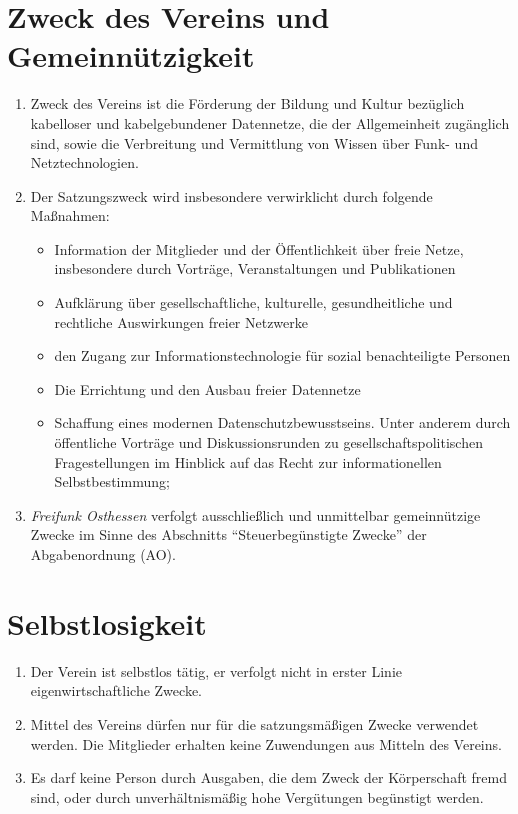 \documentclass[ngerman]{article}
\begin{document}
\section{Zweck des Vereins und Gemeinnützigkeit}
\begin{enumerate}
  \item Zweck des Vereins ist die Förderung der Bildung und Kultur bezüglich kabelloser und kabelgebundener Datennetze, die der Allgemeinheit zugänglich sind, sowie die Verbreitung und Vermittlung von Wissen über Funk- und Netztechnologien.
  \item Der Satzungszweck wird insbesondere verwirklicht durch folgende Maßnahmen:
  \begin{itemize}
    \item Information der Mitglieder und der Öffentlichkeit über freie Netze, insbesondere durch Vorträge, Veranstaltungen und Publikationen
    \item Aufklärung über gesellschaftliche, kulturelle, gesundheitliche und rechtliche Auswirkungen freier Netzwerke
    \item den Zugang zur Informationstechnologie für sozial benachteiligte Personen
    \item Die Errichtung und den Ausbau freier Datennetze
    \item Schaffung eines modernen Datenschutzbewusstseins.
    Unter anderem durch öffentliche Vorträge und Diskussionsrunden zu gesellschaftspolitischen Fragestellungen im Hinblick auf das Recht zur informationellen Selbstbestimmung;
  \end{itemize}
  \item \emph{Freifunk Osthessen} verfolgt ausschließlich und unmittelbar gemeinnützige Zwecke im Sinne des Abschnitts ``Steuerbegünstigte Zwecke'' der Abgabenordnung (AO).
\end{enumerate}

\section{Selbstlosigkeit}
\begin{enumerate}
  \item Der Verein ist selbstlos tätig, er verfolgt nicht in erster Linie eigenwirtschaftliche Zwecke.
  \item Mittel des Vereins dürfen nur für die satzungsmäßigen Zwecke verwendet werden.
  Die Mitglieder erhalten keine Zuwendungen aus Mitteln des Vereins.
  \item Es darf keine Person durch Ausgaben, die dem Zweck der Körperschaft fremd sind, oder durch unverhältnismäßig hohe Vergütungen begünstigt werden.
\end{enumerate}
\end{document}
